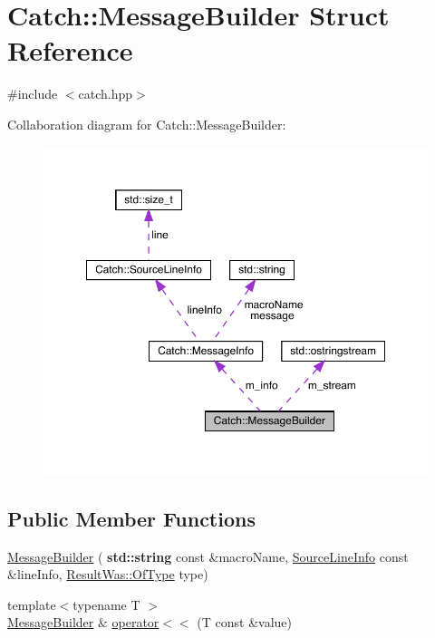 \hypertarget{struct_catch_1_1_message_builder}{}\section{Catch\+:\+:Message\+Builder Struct Reference}
\label{struct_catch_1_1_message_builder}


{\ttfamily \#include $<$catch.\+hpp$>$}



Collaboration diagram for Catch\+:\+:Message\+Builder\+:
\nopagebreak
\begin{figure}[H]
\begin{center}
\leavevmode
\includegraphics[width=350pt]{struct_catch_1_1_message_builder__coll__graph}
\end{center}
\end{figure}
\subsection*{Public Member Functions}
\begin{DoxyCompactItemize}
\item 
\hyperlink{struct_catch_1_1_message_builder_ab0c6378e722680bf58852c6ee2b6e724}{Message\+Builder} (\textbf{ std\+::string} const \&macro\+Name, \hyperlink{struct_catch_1_1_source_line_info}{Source\+Line\+Info} const \&line\+Info, \hyperlink{struct_catch_1_1_result_was_a624e1ee3661fcf6094ceef1f654601ef}{Result\+Was\+::\+Of\+Type} type)
\item 
{\footnotesize template$<$typename T $>$ }\\\hyperlink{struct_catch_1_1_message_builder}{Message\+Builder} \& \hyperlink{struct_catch_1_1_message_builder_a20fa48d069b20dddcc2d3df8abb123c1}{operator$<$$<$} (T const \&value)
\end{DoxyCompactItemize}
